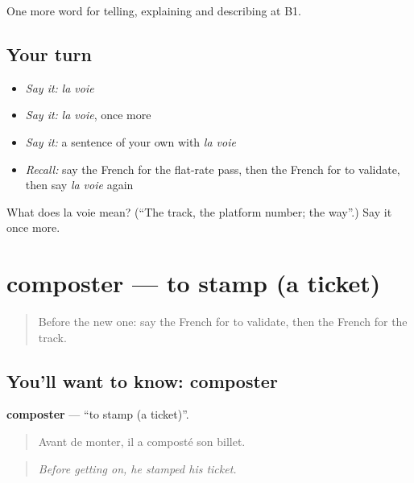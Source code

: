 \begin{grammarlens}[title={What you've built}]
One more word for telling, explaining and describing at B1.
\end{grammarlens}

\subsection*{Your turn}
\begin{itemize}
\raggedright
  \item \emph{Say it:} \emph{la voie}
  \item \emph{Say it:} \emph{la voie}, once more
  \item \emph{Say it:} a sentence of your own with \emph{la voie}
  \item \emph{Recall:} say the French for the flat-rate pass, then the French for to validate, then say \emph{la voie} again
\end{itemize}

\begin{tcolorbox}[breakable,colback=teal!4,colframe=teal!35!black,title={Before you move on}]
What does la voie mean? (\textquotedblleft{}The track, the platform number; the way\textquotedblright{}.) Say it once more.
\end{tcolorbox}
\section[composter]{composter — to stamp (a ticket)}

\label{lesson:FR-C413-composter}



\begin{quote}
Before the new one: say the French for to validate, then the French for the track.
\end{quote}

\subsection*{You'll want to know: composter}
\textbf{composter} — \textquotedblleft{}to stamp (a ticket)\textquotedblright{}.

\begin{quote}
Avant de monter, il a composté son billet.
\end{quote}

\begin{quote}
\emph{Before getting on, he stamped his ticket.}
\end{quote}

